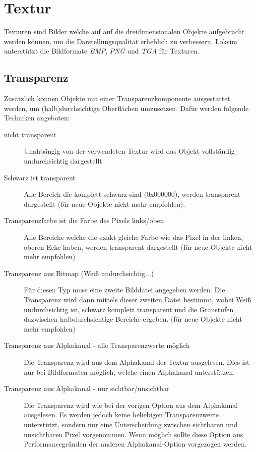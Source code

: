 \section{Textur}
\label{sec:editor-obj-textur}
Texturen sind Bilder welche auf auf die dreidimensionalen Objekte aufgebracht werden können, um die Darstellungsqualität erheblich zu verbessern. Loksim unterstützt die Bildformate \emph{BMP}, \emph{PNG} und \emph{TGA} für Texturen.

\subsection{Transparenz}
\label{sec:editor-obj-transparenz}
Zusätzlich können Objekte mit einer Transparenzkomponente ausgestattet werden, um (halb)durchsichtige Oberflächen umzusetzen. Dafür werden folgende Techniken angeboten:
\begin{description}
\item[nicht transparent] Unahbängig von der verwendeten Textur wird das Objekt vollständig undurchsichtig dargestellt
\item [Schwarz ist transparent] Alle Bereich die komplett schwarz sind (0x000000), werden transparent dargestellt (für neue Objekte nicht mehr empfohlen).
\item [Transparenzfarbe ist die Farbe des Pixels links/oben] Alle Bereiche welche die exakt gleiche Farbe wie das Pixel in der linken, oberen Ecke haben, werden transparent dargestellt (für neue Objekte nicht mehr empfohlen)
\item [Transparenz aus Bitmap (Weiß undurchsichtig...)] Für diesen Typ muss eine zweite Bilddatei angegeben werden. Die Transparenz wird dann mittels dieser zweiten Datei bestimmt, wobei Weiß undurchsichtig ist, schwarz komplett transparent und die Graustufen dazwischen halbdurchsichtige Bereiche ergeben. (für neue Objekte nicht mehr empfohlen)
\item [Transparenz aus Alphakanal - alle Transparenzwerte möglich] Die Transparenz wird aus dem Alphakanal der Textur ausgelesen. Dies ist nur bei Bildformaten möglich, welche einen Alphakanal unterstützen. 
\item [Transparenz aus Alphakanal - nur sichtbar/unsichtbar] Die Transparenz wird wie bei der vorigen Option aus dem Alphakanal ausgelesen. Es werden jedoch keine beliebigen Transparenzwerte unterstützt, sondern nur eine Unterscheidung zwischen sichtbaren und unsichtbaren  Pixel vorgenommen. Wenn möglich sollte diese Option aus Performancegründen der anderen Alphakanal-Option vorgezogen werden. 
\end{description}

